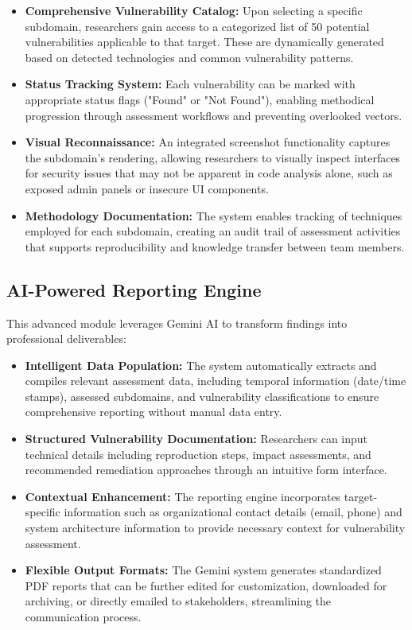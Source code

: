 \documentclass[conference]{IEEEtran}
\begin{document}
\begin{itemize}
    \item \textbf{Comprehensive Vulnerability Catalog:} Upon selecting a specific subdomain, researchers gain access to a categorized list of 50 potential vulnerabilities applicable to that target. These are dynamically generated based on detected technologies and common vulnerability patterns.
    
    \item \textbf{Status Tracking System:} Each vulnerability can be marked with appropriate status flags ("Found" or "Not Found"), enabling methodical progression through assessment workflows and preventing overlooked vectors.
    
    \item \textbf{Visual Reconnaissance:} An integrated screenshot functionality captures the subdomain's rendering, allowing researchers to visually inspect interfaces for security issues that may not be apparent in code analysis alone, such as exposed admin panels or insecure UI components.
    
    \item \textbf{Methodology Documentation:} The system enables tracking of techniques employed for each subdomain, creating an audit trail of assessment activities that supports reproducibility and knowledge transfer between team members.
\end{itemize}

\subsection{AI-Powered Reporting Engine}
This advanced module leverages Gemini AI to transform findings into professional deliverables:

\begin{itemize}
    \item \textbf{Intelligent Data Population:} The system automatically extracts and compiles relevant assessment data, including temporal information (date/time stamps), assessed subdomains, and vulnerability classifications to ensure comprehensive reporting without manual data entry.
    
    \item \textbf{Structured Vulnerability Documentation:} Researchers can input technical details including reproduction steps, impact assessments, and recommended remediation approaches through an intuitive form interface.
    
    \item \textbf{Contextual Enhancement:} The reporting engine incorporates target-specific information such as organizational contact details (email, phone) and system architecture information to provide necessary context for vulnerability assessment.
    
    \item \textbf{Flexible Output Formats:} The Gemini system generates standardized PDF reports that can be further edited for customization, downloaded for archiving, or directly emailed to stakeholders, streamlining the communication process.
\end{itemize}
\end{document}
